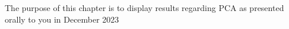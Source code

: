 
The purpose of this chapter is to display results regarding PCA as presented orally to you in December 2023